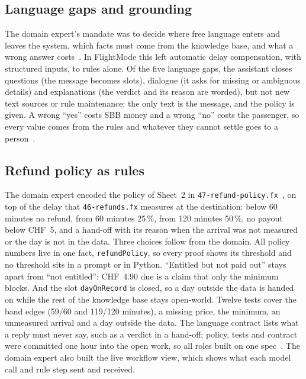 
\subsection{Language gaps and grounding}
\label{sec:usecases}

The domain expert's mandate was to decide where free language enters and leaves the system, which facts must come from the knowledge base, and what a wrong answer costs~\citep{h2task}. In FlightMode this left automatic delay compensation, with structured inputs, to rules alone. Of the five language gaps, the assistant closes questions (the message becomes slots), dialogue (it asks for missing or ambiguous details) and explanations (the verdict and its reason are worded), but not new text sources or rule maintenance: the only text is the message, and the policy is given. A wrong ``yes'' costs SBB money and a wrong ``no'' costs the passenger, so every value comes from the rules and whatever they cannot settle goes to a person~\citep{h2refundchat}.

\subsection{Refund policy as rules}
\label{sec:policy}

The domain expert encoded the policy of Sheet~2 in \texttt{47-refund-policy.fx}~\citep{h2policy}, on top of the delay that \texttt{46-refunds.fx} measures at the destination: below 60 minutes no refund, from 60 minutes 25\,\%, from 120 minutes 50\,\%, no payout below CHF~5, and a hand-off with its reason when the arrival was not measured or the day is not in the data. Three choices follow from the domain. All policy numbers live in one fact, \texttt{refundPolicy}, so every proof shows its threshold and no threshold sits in a prompt or in Python. ``Entitled but not paid out'' stays apart from ``not entitled'': CHF~4.90 due is a claim that only the minimum blocks. And the slot \texttt{dayOnRecord} is closed, so a day outside the data is handed on while the rest of the knowledge base stays open-world. Twelve tests cover the band edges (59/60 and 119/120 minutes), a missing price, the minimum, an unmeasured arrival and a day outside the data. The language contract lists what a reply must never say, such as a verdict in a hand-off; policy, tests and contract were committed one hour into the open work, so all roles built on one spec~\citep{h2refundchat}. The domain expert also built the live workflow view, which shows what each model call and rule step sent and received.
